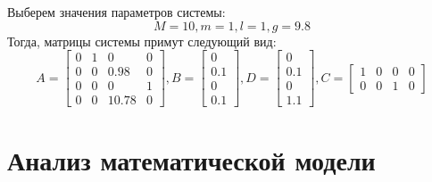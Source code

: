 Выберем значения параметров системы:
\begin{equation*}
    M = 10, m = 1, l = 1, g = 9.8
\end{equation*}
Тогда, матрицы системы примут следующий вид:
\begin{equation*}
    A = \begin{bmatrix}
        0 & 1 & 0 & 0 \\
        0 & 0 & 0.98 & 0 \\
        0 & 0 & 0 & 1 \\
        0 & 0 & 10.78 & 0
    \end{bmatrix},
    B = \begin{bmatrix}
        0 \\ 0.1 \\ 0 \\ 0.1
    \end{bmatrix},
    D = \begin{bmatrix}
        0 \\ 0.1 \\ 0 \\ 1.1
    \end{bmatrix},
    C = \begin{bmatrix}
        1 & 0 & 0 & 0 \\
        0 & 0 & 1 & 0
    \end{bmatrix}
\end{equation*}
\pagebreak

\section{Анализ математической модели}
